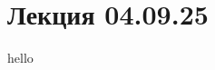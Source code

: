 \documentclass[12pt,a4paper]{article}
\begin{document}

\tableofcontents
\newpage

\section{Лекция 04.09.25}

hello
\end{document}
